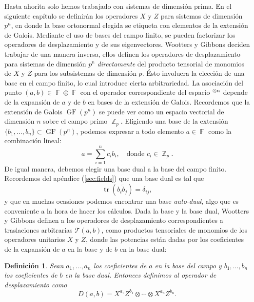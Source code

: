 \documentclass[a4paper,11pt]{report}
\DeclareMathOperator{\Z}{\mathbb{Z}}
\DeclareMathOperator{\F}{\mathbb{F}}
\let\H\relax
\DeclareMathOperator{\H}{\mathcal H}
\DeclareMathOperator{\tr}{tr}
\DeclareMathOperator{\GF}{GF}
\newtheorem{definition}{Definición}
\begin{document}
  Hasta ahorita solo hemos trabajado con sistemas de
  dimensión prima. En el siguiente capítulo se definirán los
  operadores $X$ y $Z$ para sistemas de dimensión $p^{n}$,
  en donde la base ortonormal elegida se etiqueta con
  elementos de la extensión de Galois. Mediante el uso de
  bases del campo finito, se pueden factorizar los
  operadores de desplazamiento y de sus eigenvectores.
  Wootters y Gibbons deciden trabajar de una manera inversa,
  ellos definen los operadores de desplazamiento para
  sistemas de dimensión $p^{n}$ \textit{directamente} del
  producto tensorial de monomios de $X$ y $Z$ para los
  subsistemas de dimensión $p$. Ésto involucra la elección
  de una base en el campo finito, lo cual introduce cierta
  arbitrariedad. La asociación del punto $(a,b) \in \F
  \oplus \F$ con el operador correspondiente del espacio
  $\H^{\otimes n}$ depende de la expansión de $a$ y de $b$
  en bases de la extensión de Galois.  Recordemos que la
  extensión de Galois $\GF\left(p^{n}\right)$ se puede ver
  como un espacio vectorial de dimensión $n$ sobre el campo
  primo $\Z_p$.  Eligiendo una base de la extensión
  $\{b_1,\ldots,b_n\} \subset \GF\left(p^{n}\right)$,
  podemos expresar a todo elemento $a \in \F$ como la
  combinación lineal:
  \[
    a = \sum_{i=1}^{n} c_i b_i,
    \quad
    \text{donde } c_i \in \Z_p.
  \] 
  De igual manera, debemos elegir una base dual a la base
  del campo finito. Recordemos del apéndice
  (\ref{sec:fields}) que una base dual es tal que
  \[
    \tr(b_i \tilde b_j) = \delta_{ij},
  \] 
  y que en muchas ocasiones podemos encontrar una base
  \textit{auto-dual}, algo que es conveniente a la hora de
  hacer los cálculos. Dada la base y la base dual, Wootters
  y Gibbons definen a los operadores de desplazamiento
  correspondientes a traslaciones arbitrarias $\mathcal
  T(a,b)$, como productos tensoriales de monomios de los
  operadores unitarios $X$ y $Z$, donde las potencias están
  dadas por los coeficientes de la expansión de $a$ en la
  base y de $b$ en la base dual:
  \begin{definition}
    Sean $a_1,\ldots,a_n$ los coeficientes de $a$ en la base
    del campo y $b_1,\ldots,b_n$ los coeficientes de $b$ en
    la base dual. Entonces definimos al operador de
    desplazamiento como
    \begin{equation}
      \label{eqn:wootters_hw_ops}
      D(a,b)
      = X^{a_1} Z^{b_1} \otimes \cdots \otimes X^{a_n}
      Z^{b_n}.
    \end{equation}
  \end{definition}
\end{document}
